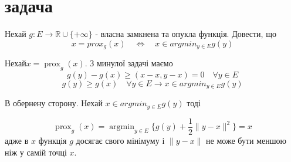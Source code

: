 \section{задача}


\begin{tcolorbox}[title = Умова]
    Нехай $ g: E \rightarrow \mathbb{R} \cup \{+\infty\} $ - власна замкнена та 
    опукла функція. Довести, що 
    $$ x = prox_g(x) \quad \Leftrightarrow \quad x \in argmin_{y \in E} g(y)$$
\end{tcolorbox}

Нехай$ x=\operatorname{prox}_g(x).$
З минулої задачі маємо
$$ g(y)-g(x) \geq(x-x, y-x) = 0 \quad \forall y \in E $$
$$ g(y) \geq g(x) \quad \forall y \in E \rightarrow x \in argmin_{y \in E} g(y) $$

В обернену сторону. Нехай $ x \in argmin_{y \in E} g(y) $ тоді

$$ \operatorname{prox}_g(x)=
\operatorname{argmin}_{y \in E}\{g(y)+\frac{1}{2}\|y-x\|^2\} = x$$
адже в $x$ функція $g$ досягає свого мінімуму і $\|y - x\|$ не може бути меншою ніж у самій точці 
$x$.
